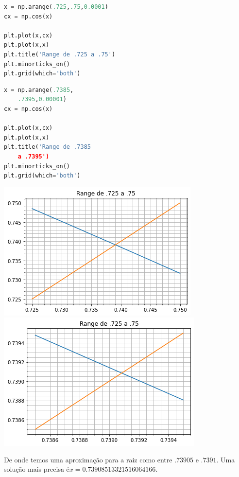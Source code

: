 \begin{minipage}{0.45\linewidth}
\begin{lstlisting}[language = Python]
x = np.arange(.725,.75,0.0001)
cx = np.cos(x)

plt.plot(x,cx)
plt.plot(x,x)
plt.title('Range de .725 a .75')
plt.minorticks_on()
plt.grid(which='both')
\end{lstlisting}
\begin{lstlisting}[language = Python]
x = np.arange(.7385,
    .7395,0.00001)
cx = np.cos(x)

plt.plot(x,cx)
plt.plot(x,x)
plt.title('Range de .7385 
    a .7395')
plt.minorticks_on()
plt.grid(which='both')
\end{lstlisting}
\end{minipage}
\hspace{0.05 \linewidth}
\begin{minipage}{0.45\linewidth}
\includegraphics[scale=0.4]{Images/range2.png}
\includegraphics[scale=0.4]{Images/range3.png}
\end{minipage}
De onde temos uma aproximação para a raiz como entre $.73905$ e $.7391$. Uma solução mais precisa é$x=0.73908513321516064166$.

